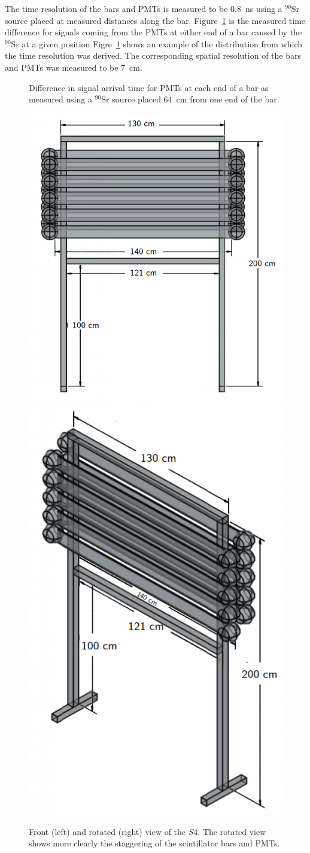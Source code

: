 The time resolution of the bars and PMTs is measured to be 0.8~ns using a $^{90}$Sr source placed at measured distances along the bar.
Figure~\ref{fig:s4Res} is the measured time difference for signals coming from the PMTs at either end of a bar caused by the $^{90}$Sr at a given position
Figre~\ref{fig:s4Res} shows an example of the distribution from which the time resolution was derived.
The corresponding spatial resolution of the bars and PMTs was measured to be 7~cm.

\begin{figure}[ht]
  \begin{adjustbox}{max totalsize={.6\textwidth}{.5\textheight},center}
    
  \end{adjustbox}
  \caption{Difference in signal arrival time for PMTs at each end of a bar as measured using a $^{90}$Sr source placed 64~cm from one end of the bar.}
  \label{fig:s4Res}	
\end{figure}

\begin{figure}[ht]    
  \centering
  \includegraphics[width=0.5\linewidth]{files/Figures/dstofFront2.png}
  \hfill
  \includegraphics[width=0.35\linewidth]{files/Figures/dstofDiag2.png}
  \caption{Front (left) and rotated (right) view of the $\mathit{S4}$. The rotated view shows more clearly the staggering of the scintillator bars and PMTs.}
  \label{fig:dstofDiagram}
\end{figure}

